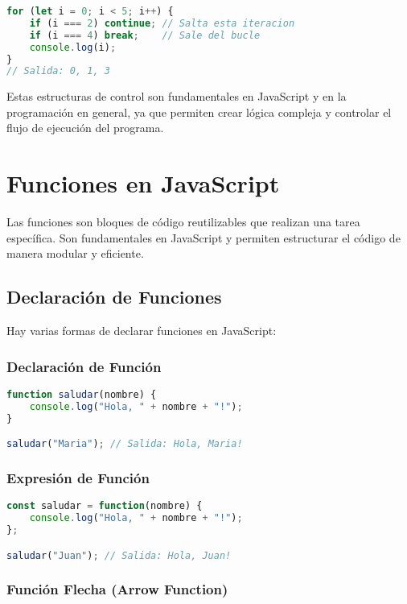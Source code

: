 \documentclass{book}
\begin{document}
\begin{lstlisting}[language=JavaScript]
for (let i = 0; i < 5; i++) {
    if (i === 2) continue; // Salta esta iteracion
    if (i === 4) break;    // Sale del bucle
    console.log(i);
}
// Salida: 0, 1, 3
\end{lstlisting}

Estas estructuras de control son fundamentales en JavaScript y en la programación en general, ya que permiten crear lógica compleja y controlar el flujo de ejecución del programa.
\section{Funciones en JavaScript}

Las funciones son bloques de código reutilizables que realizan una tarea específica. Son fundamentales en JavaScript y permiten estructurar el código de manera modular y eficiente.

\subsection{Declaración de Funciones}

Hay varias formas de declarar funciones en JavaScript:

\subsubsection{Declaración de Función}

\begin{lstlisting}[language=JavaScript]
function saludar(nombre) {
    console.log("Hola, " + nombre + "!");
}

saludar("Maria"); // Salida: Hola, Maria!
\end{lstlisting}

\subsubsection{Expresión de Función}

\begin{lstlisting}[language=JavaScript]
const saludar = function(nombre) {
    console.log("Hola, " + nombre + "!");
};

saludar("Juan"); // Salida: Hola, Juan!
\end{lstlisting}

\subsubsection{Función Flecha (Arrow Function)}
\end{document}
